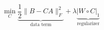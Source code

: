 \documentclass[compress]{beamer}
\begin{document}
\begin{frame}[fragile]
\begin{figure}[htp]
\begin{center}
  \end{center}
\end{figure}
$$
	\min_C \underbrace{\frac{1}{2} \| B - CA \|_F^2}_{\text{data term}} + \lambda \underbrace{|W \circ C|_1}_{\text{regularizer}}
$$
\end{frame}
\end{document}

